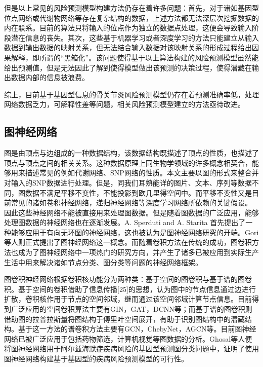 但是以上常见的风险预测模型构建方法仍存在着许多问题：首先，对于诸如基因型位点网络或代谢物网络等存在复杂结构的数据，上述方法都无法深层次挖掘数据的内在联系。目前的算法只将输入的位点作为独立的数据点处理，这便会导致输入阶段潜在信息的丧失。其次，这些基于机器学习或者深度学习的方法只能建立从输入数据到输出数据的映射关系，但无法结合输入数据对该映射关系的形成过程给出因果解释，即所谓的“黑箱化”。该问题使得基于以上算法构建的风险预测模型虽然能给出预测值，但是无法因此了解到使得模型做出该预测的决策过程，使得潜藏在输出数据内部的信息被浪费。

综上，目前基于基因型信息的骨关节炎风险预测模型仍存在着预测准确率低，处理网络数据乏力，可解释性差等问题，相关风险预测模型建立的方法亟待改进。
\subsection{图神经网络}
图是由顶点与边组成的一种数据结构，该数据结构既描述了顶点的性质，也描述了顶点与顶点之间的相关关系。这种数据原理上同生物学领域的许多概念相契合，能够用来描述常见的例如代谢网络、SNP网络的性质。本文主要以图的形式来整合并对输入的SNP数据进行处理。但是，同我们耳熟能详的图片、文本、序列等数据不同，图数据不满足平移不变性，不能投影到欧几里得空间中。而平移不变性又是目前常见的诸如卷积神经网络，递归神经网络等深度学习网络所依赖的关键假设。\cite{bronstein_geometric_2017} 因此这些神经网络不能被直接用来处理图数据。但是随着图数据的广泛应用，能够处理图数据的神经网络也在逐渐发展。A. Sperduti and A. Starita\cite{sperduti_supervised_1997} 首先提出了一种能够应用于有向无环图的神经网络，这也被认为是图神经网络研究的开端。Gori\cite{gori_new_2005}等人则正式提出了图神经网络这一概念。而随着卷积方法在传统的成功，图卷积方法也成为了图神经网络中一项热门的研究方向，并产生了诸多已被应用到实际生产生活中用来解决诸如节点分类、图分类等问题的神经网络框架。

图卷积神经网络根据卷积核功能分为两种类：基于空间的图卷积与基于谱的图卷积。基于空间的卷积借助了信息传播[25]的思想，认为图中的节点信息通过边进行扩散，卷积核作用于节点的空间邻域，继而通过该空间邻域计算节点信息。目前得到广泛应用的空间卷积算法主要有GIN\cite{xu_how_2019}，GAT\cite{velickovic_graph_2018}，DCNN\cite{atwood_diffusion-convolutional_2016}等；而基于谱的图卷积则借助图的拉普拉斯量将图结构于傅里叶空间展开，有助于识别图结构中的潜藏结构。基于这一方法的谱卷积方法主要有GCN\cite{kipf_semi-supervised_2017}，ChebyNet\cite{defferrard_convolutional_2017}，AGCN\cite{li_adaptive_2018}等。目前图神经网络已被广泛应用于包括药物筛选\cite{veselkov_hyperfoods:_2019,knyazev_spectral_2018}，计算机视觉\cite{yan_spatial_2018}等图数据的分析。Ghosal\cite{ghosal_biologically_2021}等人便将图神经网络用于阿尔兹海默症疾病风险的基因型预测图分类问题中，证明了使用图神经网络构建基于基因型的疾病风险预测模型的可行性。


